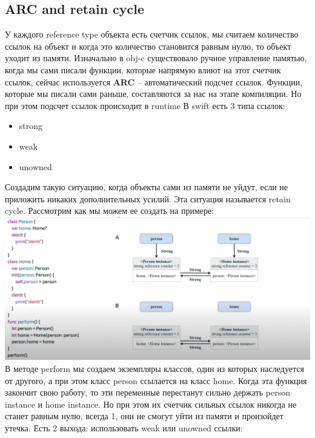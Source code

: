 \documentclass{article}
\begin{document}
    \subsection{ARC and retain cycle}
    У каждого reference type объекта есть счетчик ссылок, мы считаем количество ссылок на объект и когда это количество становится равным нулю, то объект уходит из памяти. 
    \newline
    Изначально в obj-c существовало ручное управление памятью, когда мы сами писали функции, которые напрямую влиют на этот счетчик ссылок, сейчас используется \textbf{ARC} -- автоматический подсчет ссылок. 
    \newline
    Функции, которые мы писали сами раньше, составляются за нас на этапе компиляции. Но при этом подсчет ссылок происходит в runtime
    \newline
    В swift есть 3 типа ссылок: 
    \begin{itemize}
        \item strong 
        \item weak
        \item unowned
    \end{itemize}
    Создадим такую ситуацию, когда объекты сами из памяти не уйдут, если не приложить никаких дополнительных усилий. Эта ситуация называется retain cycle. Рассмотрим как мы можем ее создать на примере: 
    \newline
    \includegraphics[scale = 0.2]{pic/arcSwiftAdv.png}
    \newline
    В методе perform мы создаем экземпляры классов, один из которых наследуется от другого, а при этом класс person ссылается на класс home.
    \newline
    Когда эта функция закончит свою работу, то эти переменные перестанут сильно держать person instance и home instance. 
    \newline
    Но при этом их счетчик сильных ссылок никогда не станет равным нулю, всегда 1, они не смогут уйти из памяти и произойдет утечка. Есть 2 выхода: использовать weak или unowned ссылки: 
\end{document}
